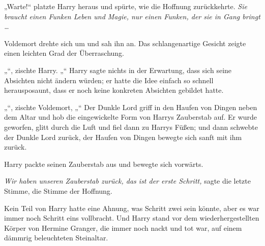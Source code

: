 „Warte!“ platzte Harry heraus und spürte, wie die Hoffnung zurückkehrte.
\emph{Sie braucht einen Funken Leben und Magie, nur einen Funken, der sie in Gang bringt …}

Voldemort drehte sich um und sah ihn an. Das schlangenartige Gesicht zeigte einen leichten Grad der Überraschung.

„“, zischte Harry. „“
Harry sagte nichts in der Erwartung, dass sich seine Absichten nicht ändern würden; er hatte die Idee einfach so schnell herausposaunt, dass er noch keine konkreten Absichten gebildet hatte.

„“, zischte Voldemort, „“
Der Dunkle Lord griff in den Haufen von Dingen neben dem Altar und hob die eingewickelte Form von Harrys Zauberstab auf. Er wurde geworfen, glitt durch die Luft und fiel dann zu Harrys Füßen; und dann schwebte der Dunkle Lord zurück, der Haufen von Dingen bewegte sich sanft mit ihm zurück.

Harry packte seinen Zauberstab aus und bewegte sich vorwärts.

\emph{Wir haben unseren Zauberstab zurück, das ist der erste Schritt,} sagte die letzte Stimme, die Stimme der Hoffnung.

Kein Teil von Harry hatte eine Ahnung, was Schritt zwei sein könnte, aber es war immer noch Schritt eins vollbracht.
Und Harry stand vor dem wiederhergestellten Körper von Hermine Granger, die immer noch nackt und tot war, auf einem dämmrig beleuchteten Steinaltar.

